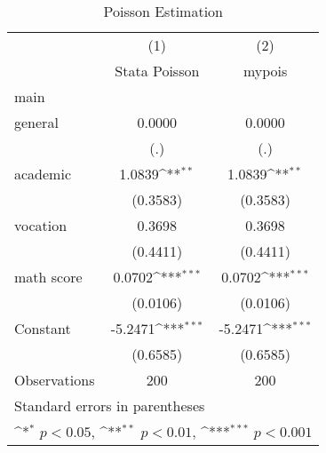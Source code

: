 \begin{table}[htbp]\centering
\def\sym#1{\ifmmode^{#1}\else\(^{#1}\)\fi}
\caption{Poisson Estimation}
\begin{tabular}{l*{2}{c}}
\hline\hline
                &\multicolumn{1}{c}{(1)}&\multicolumn{1}{c}{(2)}\\
                &\multicolumn{1}{c}{Stata Poisson}&\multicolumn{1}{c}{mypois}\\
\hline
main            &                  &                  \\
general         &   0.0000         &   0.0000         \\
                &      (.)         &      (.)         \\
[1em]
academic        &   1.0839\sym{**} &   1.0839\sym{**} \\
                & (0.3583)         & (0.3583)         \\
[1em]
vocation        &   0.3698         &   0.3698         \\
                & (0.4411)         & (0.4411)         \\
[1em]
math score      &   0.0702\sym{***}&   0.0702\sym{***}\\
                & (0.0106)         & (0.0106)         \\
[1em]
Constant        &  -5.2471\sym{***}&  -5.2471\sym{***}\\
                & (0.6585)         & (0.6585)         \\
\hline
Observations    &      200         &      200         \\
\hline\hline
\multicolumn{3}{l}{\footnotesize Standard errors in parentheses}\\
\multicolumn{3}{l}{\footnotesize \sym{*} \(p<0.05\), \sym{**} \(p<0.01\), \sym{***} \(p<0.001\)}\\
\end{tabular}
\end{table}
